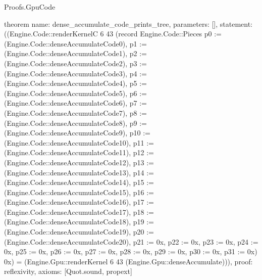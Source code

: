 \begin{lexlean}{Proofs.GpuCode}
\begin{semanticmodule}
theorem{
  name: dense_accumulate_code_prints_tree,
  parameters: [],
  statement: ((Engine.Code::renderKernelC 6 43 (record Engine.Code::Pieces {p0 := (Engine.Code::denseAccumulateCode0), p1 := (Engine.Code::denseAccumulateCode1), p2 := (Engine.Code::denseAccumulateCode2), p3 := (Engine.Code::denseAccumulateCode3), p4 := (Engine.Code::denseAccumulateCode4), p5 := (Engine.Code::denseAccumulateCode5), p6 := (Engine.Code::denseAccumulateCode6), p7 := (Engine.Code::denseAccumulateCode7), p8 := (Engine.Code::denseAccumulateCode8), p9 := (Engine.Code::denseAccumulateCode9), p10 := (Engine.Code::denseAccumulateCode10), p11 := (Engine.Code::denseAccumulateCode11), p12 := (Engine.Code::denseAccumulateCode12), p13 := (Engine.Code::denseAccumulateCode13), p14 := (Engine.Code::denseAccumulateCode14), p15 := (Engine.Code::denseAccumulateCode15), p16 := (Engine.Code::denseAccumulateCode16), p17 := (Engine.Code::denseAccumulateCode17), p18 := (Engine.Code::denseAccumulateCode18), p19 := (Engine.Code::denseAccumulateCode19), p20 := (Engine.Code::denseAccumulateCode20), p21 := 0x, p22 := 0x, p23 := 0x, p24 := 0x, p25 := 0x, p26 := 0x, p27 := 0x, p28 := 0x, p29 := 0x, p30 := 0x, p31 := 0x}) 0x) = (Engine.Gpu::renderKernel 6 43 (Engine.Gpu::denseAccumulate))),
  proof: reflexivity{},
  axioms: [Quot.sound, propext]
}
\end{semanticmodule}
\end{lexlean}
